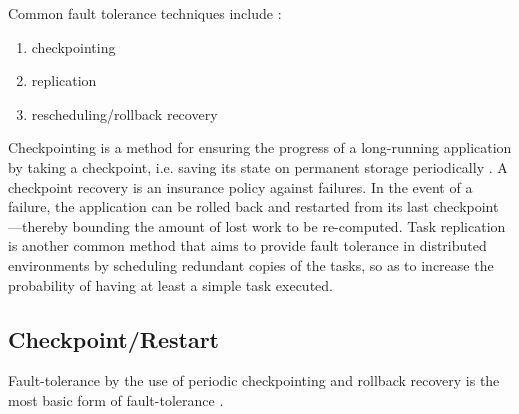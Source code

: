 \documentclass{cslthse-msc}
\begin{document}
Common fault tolerance techniques include \cite{relGridSystems}:
\begin{enumerate}
	\item checkpointing
	\item replication
	\item rescheduling/rollback recovery
\end{enumerate}

Checkpointing is a method for ensuring the progress of a long-running application by taking a checkpoint, i.e. saving its state on permanent storage periodically \cite{effTaskReplMobGrid}. A checkpoint recovery is an insurance policy against failures. In the event of a failure, the application can be rolled back and restarted from its last checkpoint—thereby bounding the amount of lost work to be re-computed. Task replication is another common method that aims to provide fault tolerance in distributed environments by scheduling redundant copies of the tasks, so as to increase the probability of having at least a simple task executed.



\subsection{Checkpoint/Restart}
Fault-tolerance by the use of periodic checkpointing and rollback recovery is the most basic form of fault-tolerance \cite{surveyFaultParallel}.
\end{document}
